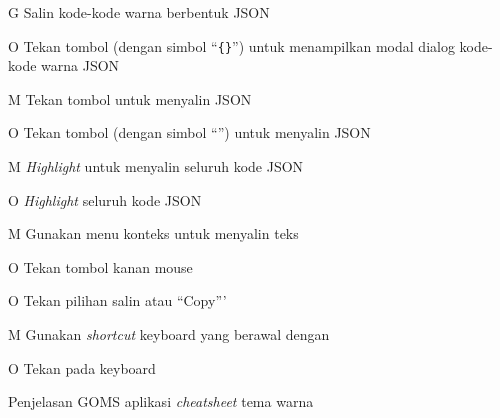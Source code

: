 \begin{chtbl}
  \begin{gomstbl}
    G{
      Salin kode-kode warna berbentuk JSON
    }

    O{
      Tekan tombol (dengan simbol ``\verb`{}`'') untuk menampilkan
      modal dialog kode-kode warna JSON
    }

    M{
      Tekan tombol untuk menyalin JSON
    }

    O{
      Tekan tombol (dengan simbol ``\faCopy[regular]'') untuk menyalin JSON
    }

    M{
      \textit{Highlight} untuk menyalin seluruh kode JSON
    }

    O{
      \textit{Highlight} seluruh kode JSON
    }

    M{
      Gunakan menu konteks untuk menyalin teks
    }

    O{
      Tekan tombol kanan mouse
    }

    O{
      Tekan pilihan salin atau ``Copy'''
    }

    M{
      Gunakan \textit{shortcut} keyboard yang berawal dengan \Ctrl
    }

    O{
      Tekan \Ctrl{+} pada keyboard
    }
  \end{gomstbl}
  \caption{Penjelasan GOMS aplikasi \textit{cheatsheet} tema warna}
\end{chtbl}
